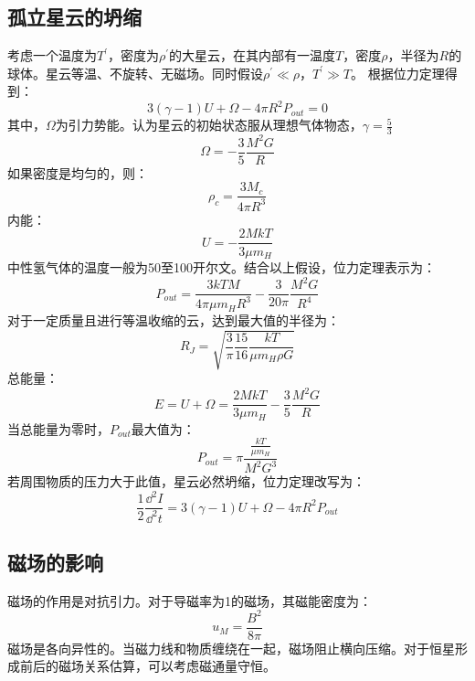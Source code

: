 \subsection{孤立星云的坍缩}
考虑一个温度为$T^\prime$，密度为$\rho^\prime$的大星云，在其内部有一温度$T$，密度$\rho$，半径为$R$的球体。星云等温、不旋转、无磁场。同时假设$\rho^\prime \ll \rho$，$T^\prime \gg T$。
根据位力定理得到：
\begin{equation}
	3(\gamma-1)U+\Omega-4\pi R^2P_{out}=0
\end{equation}
其中，$\Omega$为引力势能。认为星云的初始状态服从理想气体物态，$\gamma =\frac{5}{3}$
\begin{equation}
	\Omega=-\frac{3}{5}\frac{M^2G}{R}
\end{equation}
如果密度是均匀的，则：
\begin{equation}
	\rho_{c}=\frac{3M_{c}}{4\pi R^3}
\end{equation}
内能：
\begin{equation}
	U=-\frac{2MkT}{3\mu m_{H}}
\end{equation}
中性氢气体的温度一般为50至100开尔文。结合以上假设，位力定理表示为：
\begin{equation}
	P_{out}=\frac{3kTM}{4\pi \mu m_{H}R^3}-\frac{3}{20\pi}\frac{M^2G}{R^4}
\end{equation}
对于一定质量且进行等温收缩的云，达到最大值的半径为：
\begin{equation}
	R_{J}=\sqrt{\frac{3}{\pi}\frac{15}{16}\frac{kT}{\mu m_{H}\rho G}}
\end{equation}
总能量：
\begin{equation}
	E=U+\Omega=\frac{2MkT}{3\mu m_{H}}-\frac{3}{5}\frac{M^2G}{R}
\end{equation}
当总能量为零时，$P_{out}$最大值为：
\begin{equation}
	P_{out}=\pi\frac{\frac{kT}{\mu m_{H}}}{M^2G^3}
\end{equation}
若周围物质的压力大于此值，星云必然坍缩，位力定理改写为：
\begin{equation}
	\frac{1}{2}\frac{\dd^2 I}{\dd^2 t}=3(\gamma-1)U+\Omega-4\pi R^2P_{out}
\end{equation}
\subsection{磁场的影响}
磁场的作用是对抗引力。对于导磁率为1的磁场，其磁能密度为：
\begin{equation}
	u_{M}=\frac{B^2}{8\pi}
\end{equation}
磁场是各向异性的。当磁力线和物质缠绕在一起，磁场阻止横向压缩。对于恒星形成前后的磁场关系估算，可以考虑磁通量守恒。
